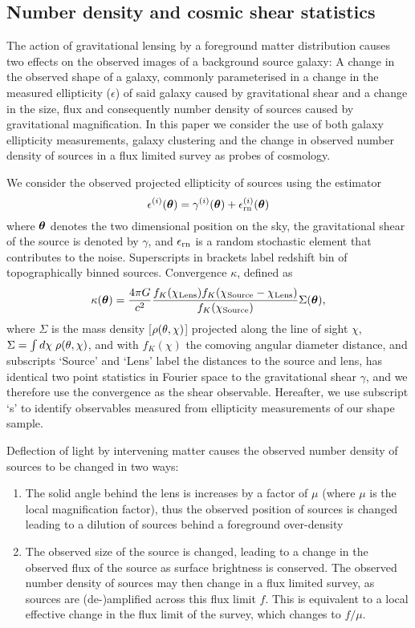 \documentclass[useAMS,usenatbib,times,letter,amssymb]{mn2e}
\def\be{\begin{equation}}
\def\ee{\end{equation}}
\newcommand{\bm}[1]{\mbox{\boldmath{$#1$}}}   %
\begin{document}
\subsection{Number density and cosmic shear statistics}

The action of gravitational lensing by a foreground matter distribution causes two effects on the observed images of a background source galaxy: A change in the observed shape of a galaxy, commonly parameterised in a change in the measured ellipticity ($\epsilon$) of said galaxy caused by gravitational shear and a change in the size, flux and consequently number density of sources caused by gravitational magnification. In this paper we consider the use of both galaxy ellipticity measurements, galaxy clustering and the change in observed number density of sources in a flux limited survey as probes of cosmology. %

We consider the observed projected ellipticity of sources using the estimator
\be\label{Eqn:EllipticityEstimator}
\epsilon^{(i)}({\bm\theta}) = \gamma^{(i)}({\bm\theta}) + \epsilon^{(i)}_{\rm rn}(\bm{\theta})
\ee
where ${\bm \theta}$ denotes the two dimensional position on the sky, the gravitational shear of the source is denoted by $\gamma$, and $\epsilon_{\rm rn}$ is a random stochastic element that contributes to the noise. Superscripts in brackets label redshift bin of topographically binned sources. Convergence $\kappa$, defined as 
\be
\kappa({\bm \theta}) = \frac{4\pi G}{c^2}\frac{f_K(\chi_{{\rm Lens}})f_K(\chi_{{\rm Source}}-\chi_{{\rm Lens}})}{f_K(\chi_{{\rm Source}})}\Sigma({\bm\theta)}, 
\ee
where $\Sigma$ is the mass density [$\rho({\bf \theta}, \chi)$] projected along the line of sight $\chi$, $\Sigma = \int d\chi \; \rho({\bf \theta}, \chi)$, and with $f_K(\chi)$ the comoving angular diameter distance, and subscripts `Source' and `Lens' label the distances to the source and lens, has identical two point statistics in Fourier space to the gravitational shear $\gamma$, and we therefore use the convergence as the shear observable. Hereafter, we use subscript `s' to identify observables measured from ellipticity measurements of our shape sample.

Deflection of light by intervening matter causes the observed number density of sources to be changed in two ways:

\begin{enumerate}
\item{The solid angle behind the lens is increases by a factor of $\mu$ (where $\mu$ is the local magnification factor), thus the observed position of sources is changed leading to a dilution of sources behind a foreground over-density}
\item{The observed size of the source is changed, leading to a change in the observed flux of the source as surface brightness is conserved. The observed number density of sources may then change in a flux limited survey, as sources are (de-)amplified across this flux limit $f$. This is equivalent to a local effective change in the flux limit of the survey, which changes to $f/\mu$.}
\end{enumerate}
\end{document}
